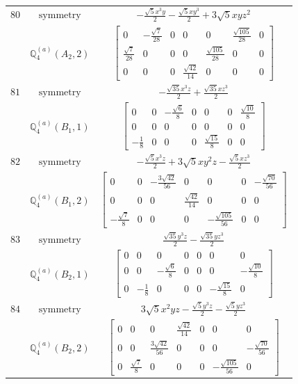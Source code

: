 \documentclass[fleqn,8pt,landscape]{jsarticle}
\begin{document}
\begin{longtable}{ccc}
$ 80 $ & $ \text{symmetry} $ & $ - \frac{\sqrt{5} x^{3} y}{2} - \frac{\sqrt{5} x y^{3}}{2} + 3 \sqrt{5} x y z^{2} $ \\
$  $ & $ \mathbb{Q}_{4}^{(a)}(A_{2},2) $ & $ \begin{bmatrix} 0 & - \frac{\sqrt{7}}{28} & 0 & 0 & 0 & \frac{\sqrt{105}}{28} & 0 \\ \frac{\sqrt{7}}{28} & 0 & 0 & 0 & \frac{\sqrt{105}}{28} & 0 & 0 \\ 0 & 0 & 0 & \frac{\sqrt{42}}{14} & 0 & 0 & 0 \end{bmatrix} $ \\ \hline
$ 81 $ & $ \text{symmetry} $ & $ - \frac{\sqrt{35} x^{3} z}{2} + \frac{\sqrt{35} x z^{3}}{2} $ \\
$  $ & $ \mathbb{Q}_{4}^{(a)}(B_{1},1) $ & $ \begin{bmatrix} 0 & 0 & - \frac{\sqrt{6}}{8} & 0 & 0 & 0 & \frac{\sqrt{10}}{8} \\ 0 & 0 & 0 & 0 & 0 & 0 & 0 \\ - \frac{1}{8} & 0 & 0 & 0 & \frac{\sqrt{15}}{8} & 0 & 0 \end{bmatrix} $ \\ \hline
$ 82 $ & $ \text{symmetry} $ & $ - \frac{\sqrt{5} x^{3} z}{2} + 3 \sqrt{5} x y^{2} z - \frac{\sqrt{5} x z^{3}}{2} $ \\
$  $ & $ \mathbb{Q}_{4}^{(a)}(B_{1},2) $ & $ \begin{bmatrix} 0 & 0 & - \frac{3 \sqrt{42}}{56} & 0 & 0 & 0 & - \frac{\sqrt{70}}{56} \\ 0 & 0 & 0 & \frac{\sqrt{42}}{14} & 0 & 0 & 0 \\ - \frac{\sqrt{7}}{8} & 0 & 0 & 0 & - \frac{\sqrt{105}}{56} & 0 & 0 \end{bmatrix} $ \\ \hline
$ 83 $ & $ \text{symmetry} $ & $ \frac{\sqrt{35} y^{3} z}{2} - \frac{\sqrt{35} y z^{3}}{2} $ \\
$  $ & $ \mathbb{Q}_{4}^{(a)}(B_{2},1) $ & $ \begin{bmatrix} 0 & 0 & 0 & 0 & 0 & 0 & 0 \\ 0 & 0 & - \frac{\sqrt{6}}{8} & 0 & 0 & 0 & - \frac{\sqrt{10}}{8} \\ 0 & - \frac{1}{8} & 0 & 0 & 0 & - \frac{\sqrt{15}}{8} & 0 \end{bmatrix} $ \\ \hline
$ 84 $ & $ \text{symmetry} $ & $ 3 \sqrt{5} x^{2} y z - \frac{\sqrt{5} y^{3} z}{2} - \frac{\sqrt{5} y z^{3}}{2} $ \\
$  $ & $ \mathbb{Q}_{4}^{(a)}(B_{2},2) $ & $ \begin{bmatrix} 0 & 0 & 0 & \frac{\sqrt{42}}{14} & 0 & 0 & 0 \\ 0 & 0 & \frac{3 \sqrt{42}}{56} & 0 & 0 & 0 & - \frac{\sqrt{70}}{56} \\ 0 & \frac{\sqrt{7}}{8} & 0 & 0 & 0 & - \frac{\sqrt{105}}{56} & 0 \end{bmatrix} $ \\ \hline

\end{longtable}
\end{document}
